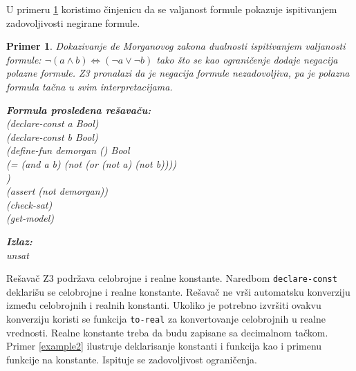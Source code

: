 \documentclass[12pt,oneside]{memoir}
\newcommand\tab[1][0.5cm]{\hspace*{#1}}
\newtheorem{primer}{Primer}
\begin{document}
U primeru \ref{example1} koristimo činjenicu da se valjanost formule pokazuje ispitivanjem zadovoljivosti negirane formule. 

\begin{primer} \label{example1} Dokazivanje de Morganovog zakona dualnosti\label{primer:demorgan} ispitivanjem valjanosti formule: $\neg{(a \land b)} \Leftrightarrow (\neg{a} \lor \neg{b}) $ tako što se kao ograničenje dodaje negacija polazne formule. Z3 pronalazi da je negacija formule nezadovoljiva, pa je polazna formula tačna u svim interpretacijama. \\

\hspace{-0.6cm}
\begin{minipage}[b]{0.5\textwidth}
\textbf{Formula prosleđena rešavaču:}
\\(declare-const a Bool)
\\(declare-const b Bool)
\\(define-fun demorgan () Bool
\\\tab (= (and a b) (not (or (not a) (not b))))
\\)
\\(assert (not demorgan))
\\(check-sat) 
\\(get-model)
\end{minipage}
\hspace{1.5cm}
\begin{minipage}[t]{0.4\textwidth}
\vspace{-5.35cm}
\textbf{Izlaz:}
\\unsat
\end{minipage}
\end{primer}

Rešavač Z3 podržava celobrojne i realne konstante. Naredbom \texttt{declare-const} deklarišu se celobrojne i realne konstante. Rešavač ne vrši automatsku konverziju između celobrojnih i realnih konstanti. Ukoliko je potrebno izvršiti ovakvu konverziju koristi se funkcija \texttt{to-real} za konvertovanje celobrojnih u realne vrednosti.
Realne konstante treba da budu zapisane sa decimalnom tačkom. Primer \ref{example2} ilustruje deklarisanje konstanti i funkcija kao i primenu funkcije na konstante. Ispituje se zadovoljivost ograničenja.
\end{document}
